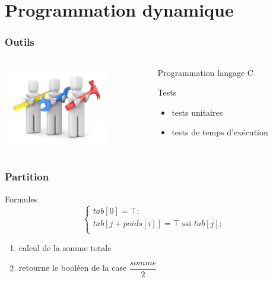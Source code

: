\documentclass[french]{beamer}
\begin{document}
\section{Programmation dynamique}

\begin{frame}
  \frametitle{Outils}
  \begin{columns}
    \begin{column}[]{5cm}
      \begin{center}
        \includegraphics[height=3.5cm]{../images/tools.jpeg}
      \end{center}
    \end{column}
      \begin{column}[]{5cm}
         \begin{block}{Programmation}
        langage C
      \end{block}
      \begin{block}{Tests}
        \begin{itemize}
        \item tests unitaires
        \item tests de temps d'exécution
        \end{itemize}
      \end{block}
      \end{column}
    \end{columns}
  \end{frame}

\begin{frame}
  \frametitle{Partition}
  \begin{alertblock}{Formules}
    \begin{equation}
      \begin{cases}
        tab[0] = \top ; \\
	tab[j + poids[i]] = \top \text{ ssi } tab[j] ; \\
      \end{cases}
    \end{equation}
  \end{alertblock}
\begin{enumerate}
\item calcul de la somme totale 
\item retourne le booléen de la case $\dfrac{somme}{2}$
\end{enumerate}
\end{frame}
\end{document}

